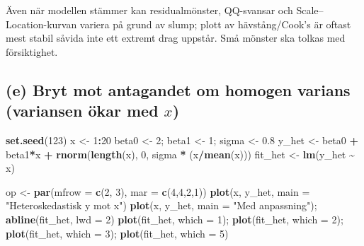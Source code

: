 \documentclass[
  11pt,
]{article}
\newenvironment{Shaded}{\begin{snugshade}}{\end{snugshade}}
\newcommand{\AttributeTok}[1]{\textcolor[rgb]{0.13,0.29,0.53}{#1}}
\newcommand{\DecValTok}[1]{\textcolor[rgb]{0.00,0.00,0.81}{#1}}
\newcommand{\FloatTok}[1]{\textcolor[rgb]{0.00,0.00,0.81}{#1}}
\newcommand{\FunctionTok}[1]{\textcolor[rgb]{0.13,0.29,0.53}{\textbf{#1}}}
\newcommand{\NormalTok}[1]{#1}
\newcommand{\OtherTok}[1]{\textcolor[rgb]{0.56,0.35,0.01}{#1}}
\newcommand{\SpecialCharTok}[1]{\textcolor[rgb]{0.81,0.36,0.00}{\textbf{#1}}}
\newcommand{\StringTok}[1]{\textcolor[rgb]{0.31,0.60,0.02}{#1}}
\begin{document}
Även när modellen stämmer kan residualmönster, QQ-svansar och
Scale--Location-kurvan variera på grund av slump; plott av
hävstång/Cook's är oftast mest stabil såvida inte ett extremt drag
uppstår. Små mönster ska tolkas med försiktighet.

\subsection{\texorpdfstring{(e) Bryt mot antagandet om homogen varians
(variansen ökar med
\(x\))}{(e) Bryt mot antagandet om homogen varians (variansen ökar med x)}}\label{e-bryt-mot-antagandet-om-homogen-varians-variansen-uxf6kar-med-x}

\begin{Shaded}
\begin{Highlighting}[]
\FunctionTok{set.seed}\NormalTok{(}\DecValTok{123}\NormalTok{)}
\NormalTok{x }\OtherTok{\textless{}{-}} \DecValTok{1}\SpecialCharTok{:}\DecValTok{20}
\NormalTok{beta0 }\OtherTok{\textless{}{-}} \DecValTok{2}\NormalTok{; beta1 }\OtherTok{\textless{}{-}} \DecValTok{1}\NormalTok{; sigma }\OtherTok{\textless{}{-}} \FloatTok{0.8}
\NormalTok{y\_het }\OtherTok{\textless{}{-}}\NormalTok{ beta0 }\SpecialCharTok{+}\NormalTok{ beta1}\SpecialCharTok{*}\NormalTok{x }\SpecialCharTok{+} \FunctionTok{rnorm}\NormalTok{(}\FunctionTok{length}\NormalTok{(x), }\DecValTok{0}\NormalTok{, sigma }\SpecialCharTok{*}\NormalTok{ (x}\SpecialCharTok{/}\FunctionTok{mean}\NormalTok{(x)))}
\NormalTok{fit\_het }\OtherTok{\textless{}{-}} \FunctionTok{lm}\NormalTok{(y\_het }\SpecialCharTok{\textasciitilde{}}\NormalTok{ x)}

\NormalTok{op }\OtherTok{\textless{}{-}} \FunctionTok{par}\NormalTok{(}\AttributeTok{mfrow =} \FunctionTok{c}\NormalTok{(}\DecValTok{2}\NormalTok{, }\DecValTok{3}\NormalTok{), }\AttributeTok{mar =} \FunctionTok{c}\NormalTok{(}\DecValTok{4}\NormalTok{,}\DecValTok{4}\NormalTok{,}\DecValTok{2}\NormalTok{,}\DecValTok{1}\NormalTok{))}
\FunctionTok{plot}\NormalTok{(x, y\_het, }\AttributeTok{main =} \StringTok{"Heteroskedastisk y mot x"}\NormalTok{)}
\FunctionTok{plot}\NormalTok{(x, y\_het, }\AttributeTok{main =} \StringTok{"Med anpassning"}\NormalTok{); }\FunctionTok{abline}\NormalTok{(fit\_het, }\AttributeTok{lwd =} \DecValTok{2}\NormalTok{)}
\FunctionTok{plot}\NormalTok{(fit\_het, }\AttributeTok{which =} \DecValTok{1}\NormalTok{); }\FunctionTok{plot}\NormalTok{(fit\_het, }\AttributeTok{which =} \DecValTok{2}\NormalTok{); }\FunctionTok{plot}\NormalTok{(fit\_het, }\AttributeTok{which =} \DecValTok{3}\NormalTok{); }\FunctionTok{plot}\NormalTok{(fit\_het, }\AttributeTok{which =} \DecValTok{5}\NormalTok{)}
\end{Highlighting}
\end{Shaded}
\end{document}
